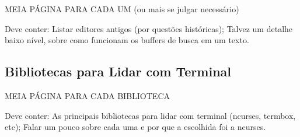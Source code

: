 MEIA PÁGINA PARA CADA UM (ou mais se julgar necessário)

Deve conter: Listar editores antigos (por questões históricas); Talvez um detalhe baixo nível, sobre como funcionam os buffers de busca
em um texto.

\subsection{Bibliotecas para Lidar com Terminal} %

MEIA PÁGINA PARA CADA BIBLIOTECA

Deve conter: As principais bibliotecas para lidar com terminal (ncurses, termbox, etc); Falar um pouco sobre cada uma e
por que a escolhida foi a ncurses.
